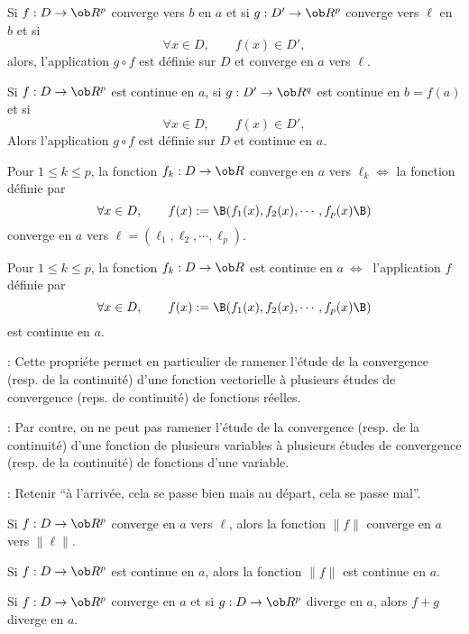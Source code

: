 Si $f:D\to\ob R^p$ converge vers $b$ en $a$ et si $g:D'\to\ob R^p$ converge vers $\ell$ en $b$ et si 
$$
\forall x\in D, \qquad f(x)\in D',
$$
alors, l'application $g\circ f$ est d\'efinie sur $D$ et converge en $a$ vers $\ell$. 


\Invertedtrue
{} 
Si $f:D\to\ob R^p$ est continue en $a$, si $g:D'\to\ob R^q$ est continue en $b=f(a)$ et si 
$$
\forall x\in D, \qquad f(x)\in D',
$$
Alors l'application $g\circ f$ est d\'efinie sur $D$ et continue en $a$. \pn


Pour $1\le k\le p$, la fonction $f_k:D\to\ob R$ converge en $a$ vers $\ell_k \Longleftrightarrow$ la fonction d\'efinie par 
$$
\forall x\in D, \qquad f(x):=\B(f_1(x),f_2(x),\cdots,f_p(x)\B)
$$
converge en $a$ vers $\ell=(\ell_1,\ell_2,\cdots,\ell_p)$. 

\Invertedtrue
\Theoreme [$a\in D\subset\ob R^n$] 
Pour $1\le k\le p$, la fonction $f_k:D\to\ob R$ est continue en $a\ \Longleftrightarrow\ $ l'application $f$ d\'efinie par 
$$
\forall x\in D, \qquad f(x):=\B(f_1(x),f_2(x),\cdots,f_p(x)\B)
$$
est continue en $a$. \pn

\Remarque : Cette propri\'ete permet en particulier de ramener l'\'etude de la convergence (resp. de la continuit\'e) d'une fonction vectorielle \`a plusieurs \'etudes de convergence (reps. de continuit\'e) de fonctions r\'eelles. 
\bigskip

\Remarque : Par contre, on ne peut pas ramener l'\'etude de la convergence (resp. de la continuit\'e) d'une fonction de plusieurs variables \`a plusieurs \'etudes de convergence (resp. de la continuit\'e) de fonctions d'une variable. 
\bigskip

\Remarque : Retenir ``\`a l'arriv\'ee, cela se passe bien mais au d\'epart, cela se passe mal''. 


Si $f:D\to\ob R^p$ converge en $a$ vers $\ell$, alors la fonction $\|f\|$ converge en $a$ vers $\|\ell\|$. 

\Invertedtrue
{} 
Si $f:D\to\ob R^p$ est continue en $a$, alors la fonction $\|f\|$ est continue en $a$. \pn


\Propriete [$D\subset\ob R^n$, $a\in\ob R^n$]
Si $f:D\to\ob R^p$ converge en $a$ et si $g:D\to\ob R^p$ diverge en $a$, alors $f+g$ diverge en $a$. 

